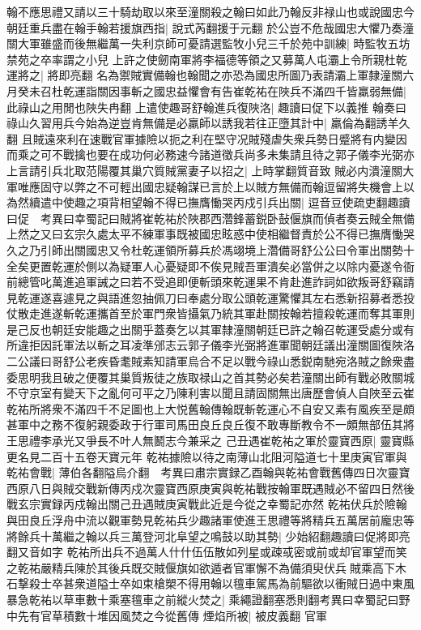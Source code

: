 翰不應思禮又請以三十騎劫取以來至潼關殺之翰曰如此乃翰反非禄山也或說國忠今朝廷重兵盡在翰手翰若援旗西指|{
	說式芮翻援于元翻}
於公豈不危哉國忠大懼乃奏潼關大軍雖盛而後無繼萬一失利京師可憂請選監牧小兒三千於苑中訓練|{
	時監牧五坊禁苑之卒率謂之小兒}
上許之使劒南軍將李福德等領之又募萬人屯灞上令所親杜乾運將之|{
	將即亮翻}
名為禦賊實備翰也翰聞之亦恐為國忠所圖乃表請灞上軍隸潼關六月癸未召杜乾運詣關因事斬之國忠益懼會有告崔乾祐在陜兵不滿四千皆羸弱無備|{
	此祿山之用閒也陜失冉翻}
上遣使趣哥舒翰進兵復陜洛|{
	趣讀曰促下以義推}
翰奏曰祿山久習用兵今始為逆豈肯無備是必羸師以誘我若往正墮其計中|{
	羸倫為翻誘羊久翻}
且賊遠來利在速戰官軍據險以扼之利在堅守况賊殘虐失衆兵勢日蹙將有内變因而乘之可不戰擒也要在成功何必務速今諸道徵兵尚多未集請且待之郭子儀李光弼亦上言請引兵北取范陽覆其巢穴質賊黨妻子以招之|{
	上時掌翻質音致}
賊必内潰潼關大軍唯應固守以弊之不可輕出國忠疑翰謀已言於上以賊方無備而翰逗留將失機會上以為然續遣中使趣之項背相望翰不得已撫膺慟哭丙戍引兵出關|{
	逗音豆使疏吏翻趣讀曰促　考異曰幸蜀記曰賊將崔乾祐於陜郡西濳鋒蓄鋭卧鼔偃旗而偵者奏云賊全無備上然之又曰玄宗久處太平不練軍事既被國忠眩惑中使相繼督責於公不得已撫膺慟哭久之乃引師出關國忠又令杜乾運領所募兵於馮翊境上濳備哥舒公公曰令軍出關勢十全矣更置乾運於側以為疑軍人心憂疑即不俟見賊吾軍潰矣必當併之以除内憂遂令衙前總管叱萬進追軍誡之曰若不受追即便斬頭來乾運果不肯赴進詐詞如欲叛哥舒竊請見乾運遂喜遽見之與語進忽抽佩刀曰奉處分取公頭乾運驚懼其左右悉新招募者悉投仗散走進遂斬乾運攜首至於軍門衆皆攝氣乃統其軍赴關按翰若擅殺乾運而奪其軍則是己反也朝廷安能趣之出關乎蓋奏乞以其軍隸潼關朝廷已許之翰召乾運受處分或有所違拒因託軍法以斬之耳凌準邠志云郭子儀李光弼將進軍聞朝廷議出潼關圖復陜洛二公議曰哥舒公老疾昏耄賊素知請軍烏合不足以戰今祿山悉鋭南馳宛洛賊之餘衆盡委思明我且破之便覆其巢質叛徒之族取禄山之首其勢必矣若潼關出師有戰必敗關城不守京室有變天下之亂何可平之乃陳利害以聞且請固關無出唐歷會偵人自陜至云崔乾祐所將衆不滿四千不足圖也上大悦舊翰傳翰既斬乾運心不自安又素有風疾至是頗甚軍中之務不復躬親委政于行軍司馬田良丘良丘復不敢專斷教令不一頗無部伍其將王思禮李承光又爭長不叶人無鬭志今兼采之}
己丑遇崔乾祐之軍於靈寶西原|{
	靈寶縣更名見二百十五卷天寶元年}
乾祐據險以待之南薄山北阻河隘道七十里庚寅官軍與乾祐會戰|{
	薄伯各翻隘烏介翻　考異曰肅宗實録乙酉翰與乾祐會戰舊傳四日次靈寶西原八日與賊交戰新傳丙戍次靈寶西原庚寅與乾祐戰按翰軍既遇賊必不留四日然後戰玄宗實録丙戍翰出關己丑遇賊庚寅戰此近是今從之幸蜀記亦然}
乾祐伏兵於險翰與田良丘浮舟中流以觀軍勢見乾祐兵少趣諸軍使進王思禮等將精兵五萬居前龐忠等將餘兵十萬繼之翰以兵三萬登河北阜望之鳴鼓以助其勢|{
	少始紹翻趣讀曰促將即亮翻又音如字}
乾祐所出兵不過萬人什什伍伍散如列星或疎㦯密或前或却官軍望而笑之乾祐嚴精兵陳於其後兵既交賊偃旗如欲遁者官軍懈不為備須臾伏兵賊乘高下木石撃殺士卒甚衆道隘士卒如束槍槊不得用翰以氊車駕馬為前驅欲以衝賊日過中東風暴急乾祐以草車數十乘塞氊車之前縱火焚之|{
	乘繩證翻塞悉則翻考異曰幸蜀記曰野中先有官草積數十堆因風焚之今從舊傳}
煙焰所被|{
	被皮義翻}
官軍

